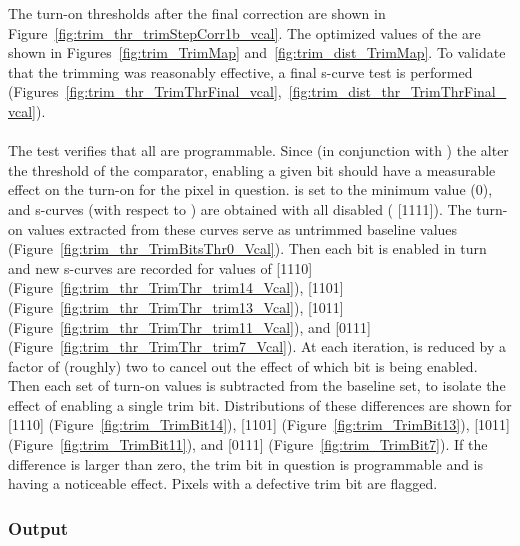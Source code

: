 The turn-on thresholds after the final correction are shown in Figure~\ref{fig:trim_thr_trimStepCorr1b_vcal}.
The optimized values of the \trimbits are shown in Figures~\ref{fig:trim_TrimMap} and~\ref{fig:trim_dist_TrimMap}.
To validate that the trimming was reasonably effective, 
a final s-curve test is performed (Figures~\ref{fig:trim_thr_TrimThrFinal_vcal},~\ref{fig:trim_dist_thr_TrimThrFinal_vcal}).
\\\\
The \trimbit test verifies that all \trimbits are programmable.
Since (in conjunction with \vtrim) the \trimbits alter the threshold of the comparator,
enabling a given bit should have a measurable effect on the \vcal turn-on for the pixel in question.
\vtrim is set to the minimum value (0),
and s-curves (with respect to \vcal) are obtained with all \trimbits disabled ( [1111]).
The turn-on values extracted from these curves serve as untrimmed baseline values (Figure~\ref{fig:trim_thr_TrimBitsThr0_Vcal}).
Then each bit is enabled in turn and new s-curves are recorded for values of 
 [1110] (Figure~\ref{fig:trim_thr_TrimThr_trim14_Vcal}),
 [1101] (Figure~\ref{fig:trim_thr_TrimThr_trim13_Vcal}),
 [1011] (Figure~\ref{fig:trim_thr_TrimThr_trim11_Vcal}), 
and  [0111] (Figure~\ref{fig:trim_thr_TrimThr_trim7_Vcal}).
At each iteration, \vtrim is reduced by a factor of (roughly) two to cancel out the effect of which bit is being enabled.
Then each set of turn-on values is subtracted from the baseline set, to isolate the effect of enabling a single trim bit.
Distributions of these differences are shown for 
 [1110] (Figure~\ref{fig:trim_TrimBit14}),
 [1101] (Figure~\ref{fig:trim_TrimBit13}),
 [1011] (Figure~\ref{fig:trim_TrimBit11}),
and  [0111] (Figure~\ref{fig:trim_TrimBit7}).
If the difference is larger than zero, the trim bit in question is programmable and is having a noticeable effect.
Pixels with a defective trim bit are flagged.

\subsubsection{Output}

